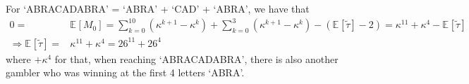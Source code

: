 \documentclass[11pt,a4paper]{ctexart}
\numberwithin{equation}{section}%
\begin{document}
For `ABRACADABRA' = `ABRA' + `CAD' + `ABRA', we have that
\begin{align*}
    0=& \mathbb{E}_{  }\left[ M_0 \right] = \sum_{k=0}^{10}(\kappa ^{k+1}-\kappa ^k) + \sum_{k=0}^{3}(\kappa ^{k+1}-\kappa ^k) - ( \mathbb{E}_{  }\left[ \tilde{\tau} \right] -2 )=\kappa ^{11} + \kappa ^{4} - \mathbb{E}_{  }\left[ \tilde{\tau} \right]  \\
    \Rightarrow \mathbb{E}_{  }\left[ \tilde{\tau} \right] =& \kappa ^{11} + \kappa ^{4}=26^{11}+26^4
\end{align*}
where $ +\kappa ^4 $ for that, when reaching `ABRACADABRA', there is also another gambler who was winning at the first 4 letters `ABRA'.























































    









 





    
\end{document}
